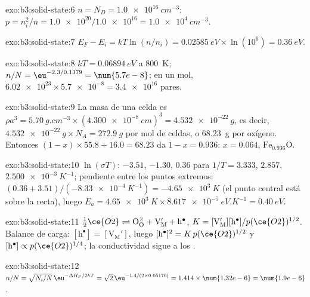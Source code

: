 \begin{solution}{exo:b3:solid-state:6}
$n = N_D = \qty{1.0e16}{cm^{-3}}$; $p = n_i^2/n = \num{1.0e20}/\num{1.0e16} = \qty{1.0e4}{cm^{-3}}$.
\end{solution}

\begin{solution}{exo:b3:solid-state:7}
$E_F - E_i = kT\ln(n/n_i) = \qty{0.02585}{eV} \times \ln(10^6) = \qty{0.36}{eV}$.
\end{solution}

\begin{solution}{exo:b3:solid-state:8}
$kT = \qty{0.06894}{eV}$ a \qty{800}{K}; $n/N = \eu^{-2.3/0.1379} = \num{5.7e-8}$; en un mol, $\num{6.02e23} \times \num{5.7e-8} = \num{3.4e16}$
pares.
\end{solution}

\begin{solution}{exo:b3:solid-state:9}
La masa de una celda es $\rho a^3 = \qty{5.70}{g.cm^{-3}} \times (\qty{4.300e-8}{cm})^3 = \qty{4.532e-22}{g}$, es decir,
$\qty{4.532e-22}{g} \times N_A = \qty{272.9}{g}$ por mol de celdas, o \qty{68.23}{g} por oxígeno. Entonces
$(1 - x) \times 55.8 + 16.0 = 68.23$ da $1 - x = 0.936$: $x = 0.064$, $\mathrm{Fe_{0.936}O}$.
\end{solution}

\begin{solution}{exo:b3:solid-state:10}
$\ln(\sigma T)$: $-3.51$, $-1.30$, $0.36$ para $1/T = 3.333$, $2.857$, $\qty{2.500e-3}{K^{-1}}$; pendiente entre los puntos extremos:
$(0.36 + 3.51)/(-\qty{8.33e-4}{K^{-1}}) = -\qty{4.65e3}{K}$ (el punto central está sobre la recta), luego
$E_a = \qty{4.65e3}{K} \times \qty{8.617e-5}{eV.K^{-1}} = \qty{0.40}{eV}$.
\end{solution}

\begin{solution}{exo:b3:solid-state:11}
$\tfrac12\ce{O2} \rightleftharpoons \mathrm{O_O^{\times} + V_M' + h^{\bullet}}$, $K = [\mathrm{V_M'}][\mathrm h^\bullet]/p(\ce{O2})^{1/2}$. Balance de carga: $[\mathrm h^\bullet] = [\mathrm{V_M'}]$, luego
$[\mathrm h^\bullet]^2 = K\,p(\ce{O2})^{1/2}$ y $[\mathrm h^\bullet] \propto p(\ce{O2})^{1/4}$; la conductividad sigue a los .
\end{solution}

\begin{solution}{exo:b3:solid-state:12}
$n/N = \sqrt{N_i/N}\,\eu^{-\Delta H_F/2kT} = \sqrt 2\,\eu^{-1.4/(2 \times 0.05170)} = 1.414 \times \num{1.32e-6} = \num{1.9e-6}$.
\end{solution}

